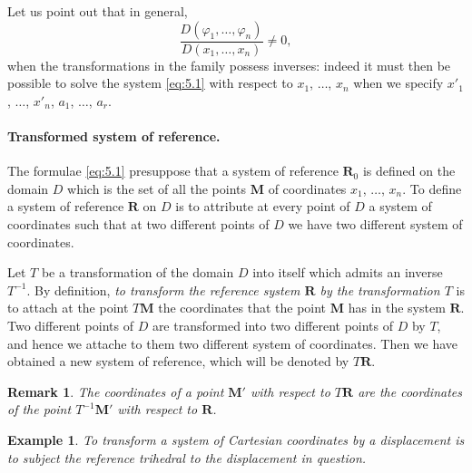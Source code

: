 \documentclass[leqno,11pt]{book}
\makeatletter
\numberwithin{equation}{chapter}
\theoremstyle{shape1}
\theoremstyle{shapesmall}
\newtheorem*{ex}{Example}
\newtheorem*{rmk}{Remark}
\let\old@phi\phi
\let\old@varphi\varphi
\let\phi\old@varphi
\let\varphi\old@phi
\makeatother
\begin{document}
Let us point out that in general,
\begin{equation}
  \label{eq:5.2}
  \frac{D(\phi_{1},\dots,\phi_{n})}{D(x_{1},\dots,x_{n})}\neq 0,
\end{equation}
when the transformations in the family possess inverses: indeed it must then be possible to solve the system \eqref{eq:5.1} with respect to $x_{1}$, $\dots$, $x_{n}$ when we specify $x'_{1}$, $\dots$, $x'_{n}$, $a_1$, $\dots$, $a_{r}$.

\paragraph{Transformed system of reference.}
\label{sec:61}
The formulae \eqref{eq:5.1} presuppose that a system of reference $\mathbf{R}_{0}$ is defined on the domain $D$ which is the set of all the points $\mathbf{M}$ of coordinates $x_{1}$, $\dots$, $x_{n}$. To define a system of reference $\mathbf{R}$ on $D$ is to attribute at every point of $D$ a system of coordinates such that at two different points of $D$ we have two different system of coordinates.

Let $T$ be a transformation of the domain $D$ into itself which admits an inverse $T^{-1}$. By definition, \emph{to transform the reference system $\mathbf{R}$ by the transformation $T$} is to attach at the point $T\mathbf{M}$ the coordinates that the point $\mathbf{M}$ has in the system $\mathbf{R}$. Two different points of $D$ are transformed into two different points of $D$ by $T$, and hence we attache to them two different system of coordinates. Then we have obtained a new system of reference, which will be denoted by $T\mathbf{R}$.

\begin{rmk}
  The coordinates of a point $\mathbf{M}'$ with respect to $T\mathbf{R}$ are the coordinates of the point $T^{-1}\mathbf{M}'$ with respect to $\mathbf{R}$.
\end{rmk}

\begin{ex}
  To transform a system of Cartesian coordinates by a displacement is to subject the reference trihedral to the displacement in question.
\end{ex}
\end{document}
